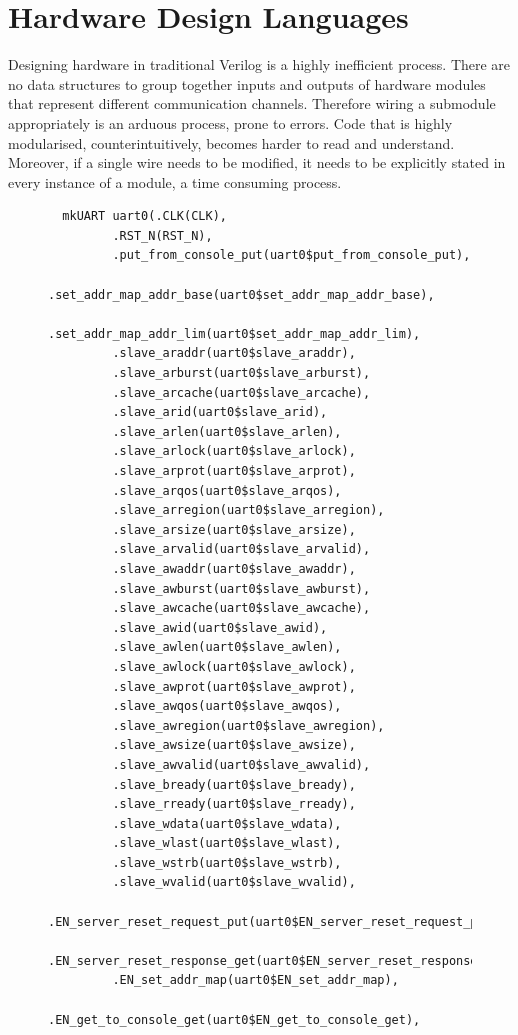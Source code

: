 \documentclass[a4paper,8pt]{report}
\begin{document}
\section{Hardware Design Languages}
Designing hardware in traditional Verilog is a highly inefficient process. There
are no data structures to group together inputs and outputs of hardware modules
that represent different communication channels. Therefore wiring a submodule
appropriately is an arduous process, prone to errors. Code that is highly
modularised, counterintuitively, becomes harder to read and understand.
Moreover, if a single wire needs to be modified, it needs to be explicitly
stated in every instance of a module, a time consuming process.

\begin{figure}[h]
\tiny
\centering
\begin{BVerbatim}
  mkUART uart0(.CLK(CLK),
         .RST_N(RST_N),
         .put_from_console_put(uart0$put_from_console_put),
         .set_addr_map_addr_base(uart0$set_addr_map_addr_base),
         .set_addr_map_addr_lim(uart0$set_addr_map_addr_lim),
         .slave_araddr(uart0$slave_araddr),
         .slave_arburst(uart0$slave_arburst),
         .slave_arcache(uart0$slave_arcache),
         .slave_arid(uart0$slave_arid),
         .slave_arlen(uart0$slave_arlen),
         .slave_arlock(uart0$slave_arlock),
         .slave_arprot(uart0$slave_arprot),
         .slave_arqos(uart0$slave_arqos),
         .slave_arregion(uart0$slave_arregion),
         .slave_arsize(uart0$slave_arsize),
         .slave_arvalid(uart0$slave_arvalid),
         .slave_awaddr(uart0$slave_awaddr),
         .slave_awburst(uart0$slave_awburst),
         .slave_awcache(uart0$slave_awcache),
         .slave_awid(uart0$slave_awid),
         .slave_awlen(uart0$slave_awlen),
         .slave_awlock(uart0$slave_awlock),
         .slave_awprot(uart0$slave_awprot),
         .slave_awqos(uart0$slave_awqos),
         .slave_awregion(uart0$slave_awregion),
         .slave_awsize(uart0$slave_awsize),
         .slave_awvalid(uart0$slave_awvalid),
         .slave_bready(uart0$slave_bready),
         .slave_rready(uart0$slave_rready),
         .slave_wdata(uart0$slave_wdata),
         .slave_wlast(uart0$slave_wlast),
         .slave_wstrb(uart0$slave_wstrb),
         .slave_wvalid(uart0$slave_wvalid),
         .EN_server_reset_request_put(uart0$EN_server_reset_request_put),
         .EN_server_reset_response_get(uart0$EN_server_reset_response_get),
         .EN_set_addr_map(uart0$EN_set_addr_map),
         .EN_get_to_console_get(uart0$EN_get_to_console_get),

\end{BVerbatim}
\end{figure}
\end{document}
